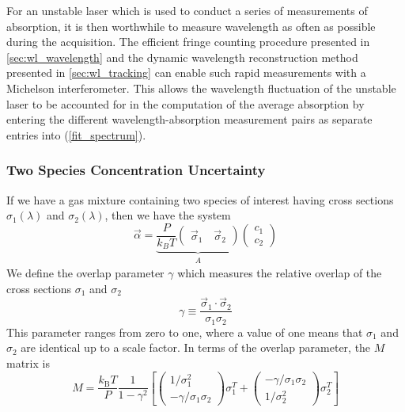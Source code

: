 \documentclass[8pt,a4paper]{report}
\begin{document}
	For an unstable laser which is used to conduct a series of measurements of absorption, it is then worthwhile to measure wavelength as often as possible during the acquisition. The efficient fringe counting procedure presented in \ref{sec:wl_wavelength} and the dynamic wavelength reconstruction method presented in \ref{sec:wl_tracking} can enable such rapid measurements with a Michelson interferometer. This allows the wavelength fluctuation of the unstable laser to be accounted for in the computation of the average absorption by entering the different wavelength-absorption measurement pairs as separate entries into (\ref{fit_spectrum}).
	
	\subsubsection{Two Species Concentration Uncertainty}
	If we have a gas mixture containing two species of interest having cross sections $\sigma_1(\lambda)$ and $\sigma_2(\lambda)$, then we have the system
	\begin{equation*}
		\vec{\alpha} =
		\underbrace{
			\frac{P}{k_B T}
			\begin{pmatrix}
				\vec{\sigma}_1 \quad \vec{\sigma}_2
			\end{pmatrix}
		}_{\begin{matrix}A\end{matrix}}
		\begin{pmatrix}
			c_1 \\
			c_2
		\end{pmatrix}
	\end{equation*}
	We define the overlap parameter $\gamma$ which measures the relative overlap of the cross sections $\sigma_1$ and $\sigma_2$
	\begin{equation}
		\gamma \equiv \frac{\vec\sigma_1\cdot\vec\sigma_2}{\sigma_1\sigma_2}
	\end{equation}
	This parameter ranges from zero to one, where a value of one means that $\sigma_1$ and $\sigma_2$ are identical up to a scale factor. In terms of the overlap parameter, the $M$ matrix is
	\begin{equation}
		M = \frac{k_\mathrm{B} T}{P} \frac{1}{1 - \gamma^2}
		\left[
		\begin{pmatrix} 1/\sigma_1^2 \\ -\gamma/\sigma_1\sigma_2 \end{pmatrix} \sigma_1^T +
		\begin{pmatrix} -\gamma/\sigma_1\sigma_2 \\ 1/\sigma_2^2 \end{pmatrix} \sigma_2^T
		\right]
	\end{equation}
\end{document}
